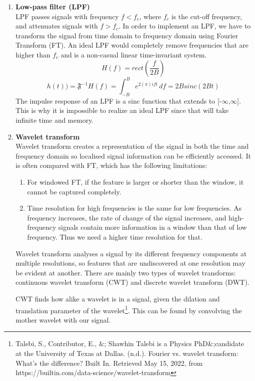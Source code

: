 \begin{enumerate}
    \item \textbf{Low-pass filter (LPF)}\\
    LPF passes signals with frequency \(f<f_{c}\), where \(f_{c}\) is the cut-off frequency, and attenuates
    signals with \(f>f_{c}\). 
    In order to implement an LPF, we have to transform the signal from time domain to 
    frequency domain using Fourier Transform (FT). An ideal LPF would completely remove frequencies that are
    higher than \(f_{c}\) and is a non-casual linear time-invariant system. 
    \[H(f) = rect(\frac{f}{2B})\]
    \[h(t))= \mathfrak{F}^{-1}{H(f)} = \int_{-B}^{B} e^{2(\pi)ift}\,df = 2Bsinc(2Bt)\]
    The impulse response of an LPF is a sinc function that extends to [-$\infty$,$\infty$]. This is why it is 
    impossible to realize an ideal LPF since that will take infinite time and memory.

    \item \textbf{Wavelet transform}\\
    Wavelet transform creates a representation of the signal in both the time and frequency domain so localised 
    signal information can be efficiently accessed. It is often compared with FT, which
    has the following limitations: 
    \begin{enumerate}
        \item For windowed FT, if the feature is larger or shorter than the window, it cannot be captured completely.
        \item Time resolution for high frequencies is the same for low frequencies. As frequency increases, the rate of 
        change of the signal increases, and high-frequency signals contain more information in a window than that of 
        low frequency. Thus we need a higher time resolution for that.
    \end{enumerate}
    Wavelet transform analyses a signal by its different frequency components at multiple resolutions, so features that are 
    undiscovered at one resolution may be evident at another. There are mainly two types of wavelet transforms: continuous wavelet transform (CWT) and discrete wavelet transform (DWT).
    
    CWT finds how alike a wavelet is in a signal, given the dilation and translation parameter of the wavelet\footnote{Talebi, S., Contributor, E., \&; Shawhin Talebi is a Physics PhD\&;candidate at the University of Texas at Dallas. (n.d.). Fourier vs. wavelet transform: What's the difference? Built In. Retrieved May 15, 2022, from https://builtin.com/data-science/wavelet-transform }.
    This can be found by convolving the mother wavelet with our signal.


\end{enumerate}
